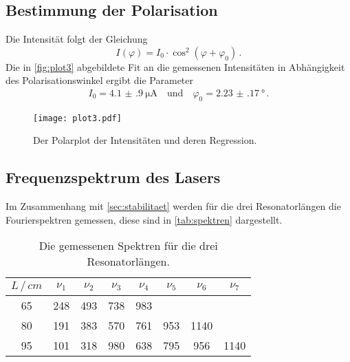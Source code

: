 \subsection{Bestimmung der Polarisation} \label{sec:polarisation}
Die Intensität folgt der Gleichung
\begin{equation}
    I(\varphi)=I_0 \cdot \cos ^2 \left(\varphi+\varphi_0\right) \, .
\end{equation}
Die in \autoref{fig:plot3} abgebildete Fit an die gemessenen Intensitäten in Abhängigkeit des Polarisationswinkel ergibt die Parameter
\begin{align*}
    I_0 = \qty{4.1(9)}{\micro\ampere} \quad \text{und} \quad \varphi_0 = \qty{2.23(17)}{\degree} \, .
\end{align*}

\begin{figure}
    \centering
    \texttt{[image: plot3.pdf]}
    \caption{Der Polarplot der Intensitäten und deren Regression.}
    \label{fig:plot3}
\end{figure}


\subsection{Frequenzspektrum des Lasers} \label{sec:spektrum}
Im Zusammenhang mit \autoref{sec:stabilitaet} werden für die drei Resonatorlängen die Fourierspektren gemessen,
diese sind in \autoref{tab:spektren} dargestellt.
\begin{table}
    \centering
    \caption{Die gemessenen Spektren für die drei Resonatorlängen.}
    \label{tab:spektren}
    \begin{tabular}{c c c c c c c c}
        \toprule
        $L \, / \, cm$ & $\nu_1$ & $\nu_2$ & $\nu_3$ & $\nu_4$ & $\nu_5$ & $\nu_6$ & $\nu_7$ \\
        \midrule
           65 &  248 &  493 &  738 &  983 &       &        &        \\
           80 &  191 &  383 &  570 &  761 & 953 & 1140 &        \\
           95 &  101 &  318 &  980 &  638 & 795 &  956 & 1140 \\
        \bottomrule
    \end{tabular}
\end{table}


